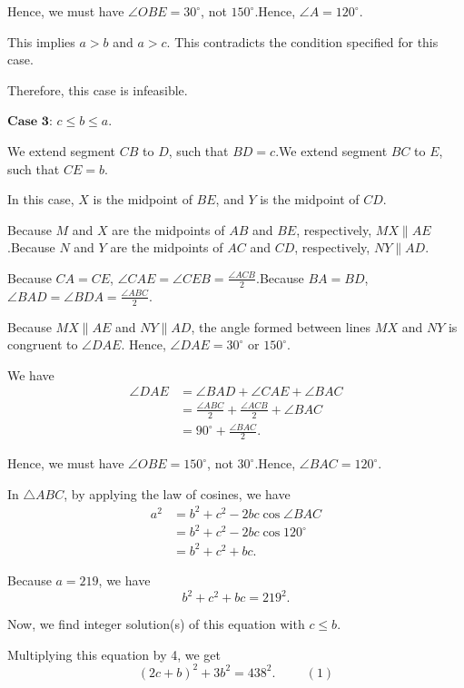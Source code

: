 \begin{enumerate}
 Hence, we must have $\angle OBE = 30^\circ$, not $150^\circ$.Hence, $\angle A = 120^\circ$.

 This implies $a > b$ and $a >c$. This contradicts the condition specified for this case.

 Therefore, this case is infeasible.

 $\textbf{Case 3}$: $c \leq b \leq a$.

 We extend segment $CB$ to $D$, such that $BD = c$.We extend segment $BC$ to $E$, such that $CE = b$.

 In this case, $X$ is the midpoint of $BE$, and $Y$ is the midpoint of $CD$.

 Because $M$ and $X$ are the midpoints of $AB$ and $BE$, respectively, $MX \parallel AE$.Because $N$ and $Y$ are the midpoints of $AC$ and $CD$, respectively, $NY \parallel AD$.

 Because $CA = CE$, $\angle CAE =\angle CEB = \frac{\angle ACB}{2}$.Because $BA = BD$, $\angle BAD = \angle BDA = \frac{\angle ABC}{2}$.

 Because $MX \parallel AE$ and $NY \parallel AD$, the angle formed between lines $MX$ and $NY$ is congruent to $\angle DAE$. Hence, $\angle DAE = 30^\circ$ or $150^\circ$.

 We have
 \begin{align*} \angle DAE & = \angle BAD + \angle CAE + \angle BAC \\ & = \frac{\angle ABC}{2} + \frac{\angle ACB}{2} + \angle BAC \\ & = 90^\circ + \frac{\angle BAC}{2} . \end{align*}


 Hence, we must have $\angle OBE = 150^\circ$, not $30^\circ$.Hence, $\angle BAC = 120^\circ$.

 In $\triangle ABC$, by applying the law of cosines, we have
 \begin{align*} a^2 & = b^2 + c^2 - 2bc \cos \angle BAC\\ & =  b^2 + c^2 - 2bc \cos 120^\circ \\ & = b^2 + c^2 + bc . \end{align*}


 Because $a = 219$, we have
 \[ b^2 + c^2 + bc  = 219^2 . \]

 Now, we find integer solution(s) of this equation with $c \leq b$.

 Multiplying this equation by 4, we get
 \[ \left( 2 c + b \right)^2 + 3 b^2 = 438^2 . \hspace{1cm} (1) \]


\end{enumerate}

